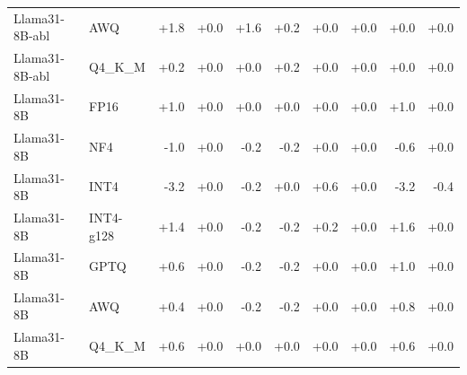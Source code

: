 \begin{tabular}{@{}l l r r r r r r r r @{}}
Llama31-8B-abl & AWQ & +1.8 & +0.0 & +1.6 & +0.2 & +0.0 & +0.0 & +0.0 & +0.0 \\
Llama31-8B-abl & Q4\_K\_M & +0.2 & +0.0 & +0.0 & +0.2 & +0.0 & +0.0 & +0.0 & +0.0 \\
Llama31-8B & FP16 & +1.0 & +0.0 & +0.0 & +0.0 & +0.0 & +0.0 & +1.0 & +0.0 \\
Llama31-8B & NF4 & -1.0 & +0.0 & -0.2 & -0.2 & +0.0 & +0.0 & -0.6 & +0.0 \\
Llama31-8B & INT4 & -3.2 & +0.0 & -0.2 & +0.0 & +0.6 & +0.0 & -3.2 & -0.4 \\
Llama31-8B & INT4-g128 & +1.4 & +0.0 & -0.2 & -0.2 & +0.2 & +0.0 & +1.6 & +0.0 \\
Llama31-8B & GPTQ & +0.6 & +0.0 & -0.2 & -0.2 & +0.0 & +0.0 & +1.0 & +0.0 \\
Llama31-8B & AWQ & +0.4 & +0.0 & -0.2 & -0.2 & +0.0 & +0.0 & +0.8 & +0.0 \\
Llama31-8B & Q4\_K\_M & +0.6 & +0.0 & +0.0 & +0.0 & +0.0 & +0.0 & +0.6 & +0.0 \\
\bottomrule
\end{tabular}
